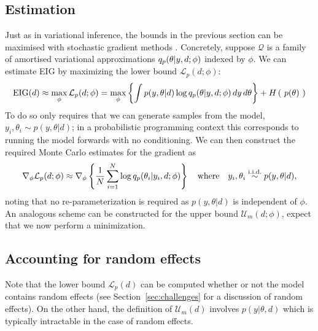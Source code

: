 \subsection{Estimation}
Just as in variational inference, the bounds in the previous section can be maximised with stochastic gradient methods \cite{robbins1951stochastic}. Concretely, suppose $\mathcal{Q}$ is a family of amortised variational approximations $q_p(\theta | y, d; \phi)$  indexed by $\phi$. We can estimate EIG by maximizing the lower bound $\mathcal{L}_p(d;\phi)$:
\begin{equation}
	\label{eq:maxpost}
	\text{EIG}(d) \approx \max_\phi \mathcal{L}_p(d;\phi) =
	\max_\phi \left\{ \int p(y, \theta | d) \log q_p (\theta | y, d; \phi)\, dy\, d\theta  \right\} + H\left(\ p(\theta)\ \right)
\end{equation}
To do so only requires  that we can generate samples from the model,
$y_i, \theta_i \sim p(y, \theta | d)$; 
in a probabilistic programming context this corresponds to running the model forwards with no conditioning.
We can then construct the required Monte Carlo estimates for the gradient as
\begin{equation}
\nabla_{\phi} \mathcal{L}_p(d;\phi) \approx \nabla_\phi \left\{\frac{1}{N}\sum_{i=1}^N \log q_p(\theta_i|y_i, d; \phi)\right\} \quad \text{where} \quad y_i, \theta_i \overset{\tiny{\text{i.i.d.}}}{\sim} p(y, \theta | d),
\end{equation}
noting that no re-parameterization is required as $p(y,\theta|d)$ is independent of $\phi$.
An analogous scheme can be constructed for the upper bound $\mathcal{U}_m(d;\phi)$, expect that we now
perform a minimization.


\subsection{Accounting for random effects}
Note that the lower bound $\mathcal{L}_p(d)$ can be computed whether or not the model contains random effects (see Section~\ref{sec:challenges} for a discussion of random effects). On the other hand, the definition of $\mathcal{U}_m(d)$ involves $p(y|\theta,d)$ which is typically intractable in the case of random effects.

